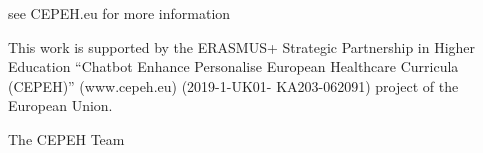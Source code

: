 \documentclass[a4paper, nobind]{templates/ociamthesis}
\begin{document}

\begin{romanpages}

\maketitle

\begin{dedication}
  see CEPEH.eu for more information
\end{dedication}



\begin{acknowledgements}
 	This work is supported by the ERASMUS+ Strategic Partnership in Higher Education ``Chatbot Enhance Personalise European Healthcare Curricula (CEPEH)'' (www.cepeh.eu) (2019-1-UK01- KA203-062091) project of the European Union.

 \begin{flushright}
 The CEPEH Team \\
 \end{flushright}
\end{acknowledgements}






\end{romanpages}
\end{document}
